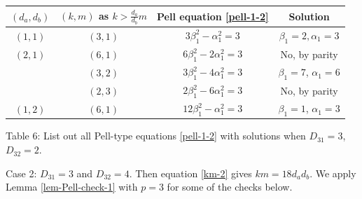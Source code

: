 \documentclass[12pt]{article}
\begin{document}
\begin{center}
\begin{tabular}{|c|c|c|c|}
\hline
$(d_a, d_b)$ & $(k, m)$ as $k > \frac{d_a}{d_b} m$ & Pell equation \eqref{pell-1-2} & Solution  \\
\hline
$(1, 1)$ & $(3, 1)$ & $3 \beta_1^2 - \alpha_1^2 = 3$ & $\beta_1 = 2, \alpha_1 = 3$ \\
\hline
$(2,1)$ & $(6,1)$ & $6 \beta_1^2 - 2 \alpha_1^2 = 3$ & No, by parity \\
\hline & $(3,2)$ & $3 \beta_1^2 - 4 \alpha_1^2 = 3$ & $\beta_1 = 7$, $\alpha_1 = 6$ \\
\hline & $(2,3)$ & $2 \beta_1^2 - 6 \alpha_1^2 = 3$ & No, by parity \\
\hline
$(1,2)$ & $(6,1)$ & $12 \beta_1^2 - \alpha_1^2 = 3$ & $\beta_1 = 1$, $\alpha_1 = 3$ \\
\hline
\end{tabular}
\newline \small{Table 6: List out all Pell-type equations \eqref{pell-1-2} with solutions when $D_{31} = 3$, $D_{32} = 2$.}
\end{center}

Case 2: $D_{31} = 3$ and $D_{32} = 4$. Then equation \eqref{km-2} gives $k m = 18 d_a d_b$. We apply Lemma \ref{lem-Pell-check-1} with $p = 3$ for some of the checks below.
\end{document}
